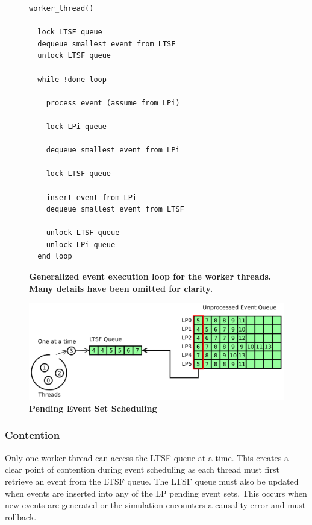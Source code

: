 \documentclass[a4paper]{article}
\begin{document}
\linespread{1.0}
\begin{figure}
\begin{verbatim}
worker_thread()

  lock LTSF queue
  dequeue smallest event from LTSF
  unlock LTSF queue

  while !done loop

    process event (assume from LPi)

    lock LPi queue 

    dequeue smallest event from LPi

    lock LTSF queue

    insert event from LPi
    dequeue smallest event from LTSF

    unlock LTSF queue
    unlock LPi queue
  end loop
\end{verbatim}
\linespread{2.0}
\caption{\textbf{Generalized event execution loop for the worker threads.  Many details
have been omitted for clarity.}}\label{workerThreadAlgorithm}
\end{figure}

\begin{figure}[H]
    \centering
    \graphicspath{ {./figures/} }
    \includegraphics[width=\textwidth,height=\textheight,keepaspectratio]{single_ltsf_queue}
    \caption{\textbf{Pending Event Set Scheduling}}
    \label{fig:singleLTSFqueue}
\end{figure}

\subsubsection{\textbf{Contention}}

Only one worker thread can access the LTSF queue at a time.  This creates a
clear point of contention during event scheduling as each thread must first
retrieve an event from the LTSF queue.  The LTSF queue must also be updated when
events are inserted into any of the LP pending event sets.  This occurs when new
events are generated or the simulation encounters a causality error and must
rollback.
\par
\end{document}
